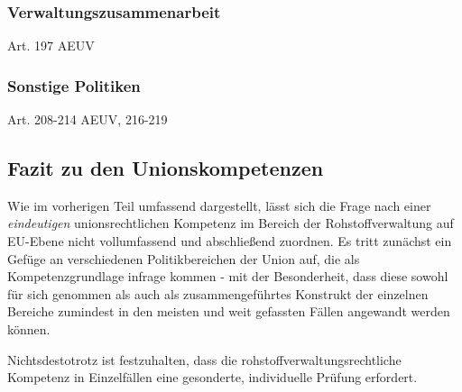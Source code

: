 \documentclass[12pt,a4paper,oneside]{book} %
\begin{document}
	
	\subsubsection{Verwaltungszusammenarbeit}
	Art. 197 AEUV
	
	\subsubsection{Sonstige Politiken}
	Art. 208-214 AEUV, 216-219
	
	\subsection{Fazit zu den Unionskompetenzen}
	Wie im vorherigen Teil umfassend dargestellt, lässt sich die Frage nach einer \textit{eindeutigen} unionsrechtlichen Kompetenz im Bereich der Rohstoffverwaltung auf EU-Ebene nicht vollumfassend und abschließend zuordnen. Es tritt zunächst ein Gefüge an verschiedenen Politikbereichen der Union auf, die als Kompetenzgrundlage infrage kommen - mit der Besonderheit, dass diese sowohl für sich genommen als auch als zusammengeführtes Konstrukt der einzelnen Bereiche zumindest in den meisten und weit gefassten Fällen angewandt werden können.
	
	Nichtsdestotrotz ist festzuhalten, dass die rohstoffverwaltungsrechtliche Kompetenz in Einzelfällen eine gesonderte, individuelle Prüfung erfordert.
	
\end{document}
